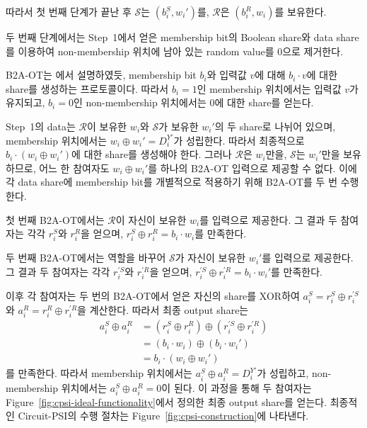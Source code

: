 \documentclass[sigconf,anonymous,review]{acmart}
\begin{document}
따라서 첫 번째 단계가 끝난 후
$\mathcal{S}$는 $(b_i^S,w_i')$를,
$\mathcal{R}$은 $(b_i^R,w_i)$를 보유한다.


두 번째 단계에서는 Step~1에서 얻은 membership bit의 Boolean share와
data share를 이용하여 non-membership 위치에 남아 있는 random value를
$0$으로 제거한다.

B2A-OT는 에서 설명하였듯, membership bit $b_i$와 입력값 $v$에 대해
$b_i\cdot v$에 대한 share를 생성하는 프로토콜이다.
따라서 $b_i=1$인 membership 위치에서는 입력값 $v$가 유지되고,
$b_i=0$인 non-membership 위치에서는 $0$에 대한 share를 얻는다.

Step~1의 data는 $\mathcal{R}$이 보유한 $w_i$와
$\mathcal{S}$가 보유한 $w_i'$의 두 share로 나뉘어 있으며,
membership 위치에서는 $w_i\oplus w_i'=D_i^{Y'}$가 성립한다.
따라서 최종적으로 $b_i\cdot(w_i\oplus w_i')$에 대한 share를
생성해야 한다. 그러나 $\mathcal{R}$은 $w_i$만을,
$\mathcal{S}$는 $w_i'$만을 보유하므로, 어느 한 참여자도
$w_i\oplus w_i'$를 하나의 B2A-OT 입력으로 제공할 수 없다.
이에 각 data share에 membership bit를 개별적으로 적용하기 위해
B2A-OT를 두 번 수행한다.

첫 번째 B2A-OT에서는 $\mathcal{R}$이 자신이 보유한 $w_i$를
입력으로 제공한다. 그 결과 두 참여자는 각각 $r_i^S$와 $r_i^R$을
얻으며, $r_i^S\oplus r_i^R=b_i\cdot w_i$를 만족한다.

두 번째 B2A-OT에서는 역할을 바꾸어 $\mathcal{S}$가 자신이 보유한
$w_i'$를 입력으로 제공한다. 그 결과 두 참여자는 각각
$r_i^{\prime S}$와 $r_i^{\prime R}$을 얻으며,
$r_i^{\prime S}\oplus r_i^{\prime R}=b_i\cdot w_i'$를 만족한다.

이후 각 참여자는 두 번의 B2A-OT에서 얻은 자신의 share를 XOR하여
$a_i^S=r_i^S\oplus r_i^{\prime S}$와
$a_i^R=r_i^R\oplus r_i^{\prime R}$을 계산한다. 따라서 최종 output
share는
\[
\begin{aligned}
a_i^S\oplus a_i^R
&=(r_i^S\oplus r_i^R)
  \oplus(r_i^{\prime S}\oplus r_i^{\prime R})\\
&=(b_i\cdot w_i)\oplus(b_i\cdot w_i')\\
&=b_i\cdot(w_i\oplus w_i')
\end{aligned}
\]
를 만족한다. 따라서 membership 위치에서는
$a_i^S\oplus a_i^R=D_i^{Y'}$가 성립하고,
non-membership 위치에서는 $a_i^S\oplus a_i^R=0$이 된다.
이 과정을 통해 두 참여자는
Figure~\ref{fig:cpsi-ideal-functionality}에서 정의한 최종 output
share를 얻는다.
최종적인 Circuit-PSI의 수행 절차는 Figure~\ref{fig:cpsi-construction}에 나타낸다.
\end{document}

